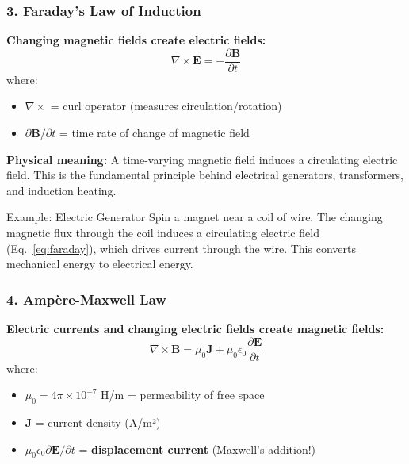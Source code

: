 \subsubsection{3. Faraday's Law of Induction}

\textbf{Changing magnetic fields create electric fields:}
\begin{equation}
\nabla \times \mathbf{E} = -\frac{\partial \mathbf{B}}{\partial t}
\label{eq:faraday}
\end{equation}
where:
\begin{itemize}
\item $\nabla \times$ = curl operator (measures circulation/rotation)
\item $\partial \mathbf{B}/\partial t$ = time rate of change of magnetic field
\end{itemize}

\textbf{Physical meaning:} A time-varying magnetic field induces a circulating electric field. This is the fundamental principle behind electrical generators, transformers, and induction heating.

\begin{calloutbox}{Example: Electric Generator}
Spin a magnet near a coil of wire. The changing magnetic flux through the coil induces a circulating electric field (Eq.~\ref{eq:faraday}), which drives current through the wire. This converts mechanical energy to electrical energy.
\end{calloutbox}

\subsubsection{4. Ampère-Maxwell Law}

\textbf{Electric currents and changing electric fields create magnetic fields:}
\begin{equation}
\nabla \times \mathbf{B} = \mu_0 \mathbf{J} + \mu_0 \epsilon_0 \frac{\partial \mathbf{E}}{\partial t}
\label{eq:ampere-maxwell}
\end{equation}
where:
\begin{itemize}
\item $\mu_0 = 4\pi \times 10^{-7}$ H/m = permeability of free space
\item $\mathbf{J}$ = current density (A/m²)
\item $\mu_0 \epsilon_0 \partial \mathbf{E}/\partial t$ = \textbf{displacement current} (Maxwell's addition!)
\end{itemize}

